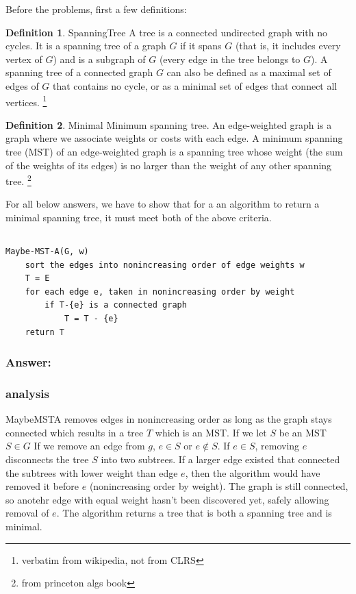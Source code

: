 \documentclass[titlepage]{article}
\theoremstyle{definition}
\newtheorem{definition}{Definition}[section]
\begin{document}
Before the problems, first a few definitions:

\theoremstyle{definition}
\begin{definition}{SpanningTree}
  A tree is a connected undirected graph with no cycles. It is a spanning tree
  of a graph $G$ if it spans $G$ (that is, it includes every vertex of $G$) and is a
  subgraph of $G$ (every edge in the tree belongs to $G$). A spanning tree of a
  connected graph $G$ can also be defined as a maximal set of edges of $G$ that
  contains no cycle, or as a minimal set of edges that connect all vertices.
  \footnote{verbatim from wikipedia, not from CLRS}
\end{definition}
\begin{definition}{Minimal}
  Minimum spanning tree. An edge-weighted graph is a graph where we associate
  weights or costs with each edge. A minimum spanning tree (MST) of an
  edge-weighted graph is a spanning tree whose weight (the sum of the weights
  of its edges) is no larger than the weight of any other spanning tree.
  \footnote{from princeton algs book}
\end{definition}

For all below answers, we have to show that for a an algorithm to return a
minimal spanning tree, it must meet both of the above criteria.

\subsection{}
\begin{lstlisting}
Maybe-MST-A(G, w)
	sort the edges into nonincreasing order of edge weights w
	T = E
	for each edge e, taken in nonincreasing order by weight
		if T-{e} is a connected graph
			T = T - {e}
	return T
\end{lstlisting}
\subsubsection{Answer: }
    \subsubsection{analysis}
      MaybeMSTA removes edges in nonincreasing order as long as the graph stays
      connected which results in a tree $T$ which is an MST. If we let $S$ be an
      MST $S \in G$  If we remove an edge from $g$, $e \in S$ or $e \notin S$. If
      $e \in S$, removing $e$ disconnects the tree $S$ into two subtrees. If a
      larger edge existed that connected the subtrees with lower weight than edge
      $e$, then the algorithm would have removed it before $e$ (nonincreasing order
      by weight). The graph is still connected, so anotehr edge with equal weight
      hasn't been discovered yet, safely allowing removal of $e$. 
      The algorithm returns a tree that is both a spanning tree and is minimal.
\end{document}
